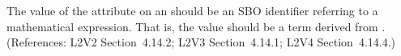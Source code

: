 The value of the  attribute on an \EventAssignment should be an
SBO identifier referring to a mathematical expression.  That is, the value
should be a term derived from \sbomathformula.  (References: L2V2 Section~4.14.2;
L2V3 Section~4.14.1; L2V4 Section~4.14.4.)
